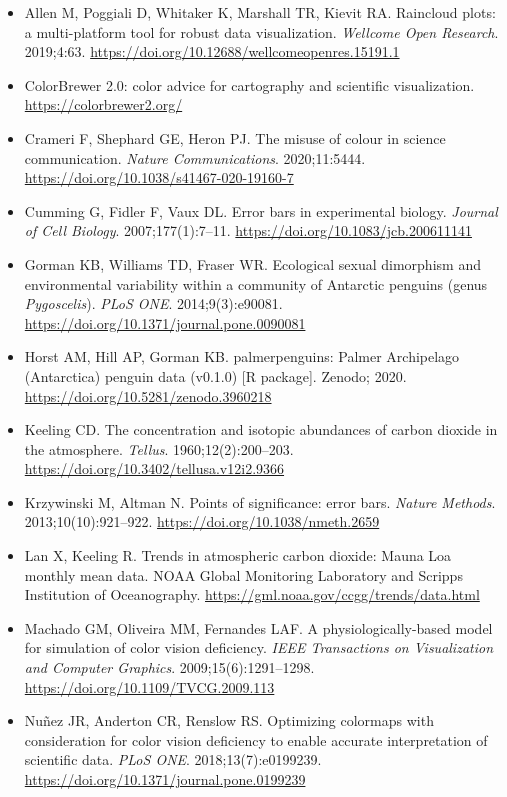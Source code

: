 \begin{itemize}
\item Allen M, Poggiali D, Whitaker K, Marshall TR, Kievit RA. Raincloud plots: a multi-platform tool for robust data visualization. \emph{Wellcome Open Research}. 2019;4:63. \url{https://doi.org/10.12688/wellcomeopenres.15191.1}
\item ColorBrewer 2.0: color advice for cartography and scientific visualization. \url{https://colorbrewer2.org/}
\item Crameri F, Shephard GE, Heron PJ. The misuse of colour in science communication. \emph{Nature Communications}. 2020;11:5444. \url{https://doi.org/10.1038/s41467-020-19160-7}
\item Cumming G, Fidler F, Vaux DL. Error bars in experimental biology. \emph{Journal of Cell Biology}. 2007;177(1):7--11. \url{https://doi.org/10.1083/jcb.200611141}
\item Gorman KB, Williams TD, Fraser WR. Ecological sexual dimorphism and environmental variability within a community of Antarctic penguins (genus \emph{Pygoscelis}). \emph{PLoS ONE}. 2014;9(3):e90081. \url{https://doi.org/10.1371/journal.pone.0090081}
\item Horst AM, Hill AP, Gorman KB. palmerpenguins: Palmer Archipelago (Antarctica) penguin data (v0.1.0) [R package]. Zenodo; 2020. \url{https://doi.org/10.5281/zenodo.3960218}
\item Keeling CD. The concentration and isotopic abundances of carbon dioxide in the atmosphere. \emph{Tellus}. 1960;12(2):200--203. \url{https://doi.org/10.3402/tellusa.v12i2.9366}
\item Krzywinski M, Altman N. Points of significance: error bars. \emph{Nature Methods}. 2013;10(10):921--922. \url{https://doi.org/10.1038/nmeth.2659}
\item Lan X, Keeling R. Trends in atmospheric carbon dioxide: Mauna Loa monthly mean data. NOAA Global Monitoring Laboratory and Scripps Institution of Oceanography. \url{https://gml.noaa.gov/ccgg/trends/data.html}
\item Machado GM, Oliveira MM, Fernandes LAF. A physiologically-based model for simulation of color vision deficiency. \emph{IEEE Transactions on Visualization and Computer Graphics}. 2009;15(6):1291--1298. \url{https://doi.org/10.1109/TVCG.2009.113}
\item Nu\~nez JR, Anderton CR, Renslow RS. Optimizing colormaps with consideration for color vision deficiency to enable accurate interpretation of scientific data. \emph{PLoS ONE}. 2018;13(7):e0199239. \url{https://doi.org/10.1371/journal.pone.0199239}

\end{itemize}
